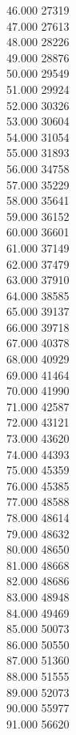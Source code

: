 { 46.000	27319 \\
 47.000	27613 \\
 48.000	28226 \\
 49.000	28876 \\
 50.000	29549 \\
 51.000	29924 \\
 52.000	30326 \\
 53.000	30604 \\
 54.000	31054 \\
 55.000	31893 \\
 56.000	34758 \\
 57.000	35229 \\
 58.000	35641 \\
 59.000	36152 \\
 60.000	36601 \\
 61.000	37149 \\
 62.000	37479 \\
 63.000	37910 \\
 64.000	38585 \\
 65.000	39137 \\
 66.000	39718 \\
 67.000	40378 \\
 68.000	40929 \\
 69.000	41464 \\
 70.000	41990 \\
 71.000	42587 \\
 72.000	43121 \\
 73.000	43620 \\
 74.000	44393 \\
 75.000	45359 \\
 76.000	45385 \\
 77.000	48588 \\
 78.000	48614 \\
 79.000	48632 \\
 80.000	48650 \\
 81.000	48668 \\
 82.000	48686 \\
 83.000	48948 \\
 84.000	49469 \\
 85.000	50073 \\
 86.000	50550 \\
 87.000	51360 \\
 88.000	51555 \\
 89.000	52073 \\
 90.000	55977 \\
 91.000	56620 \\
}
